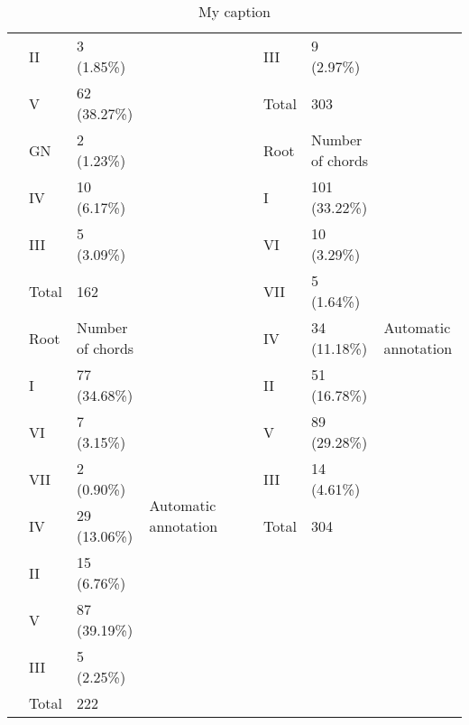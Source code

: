 \begin{table}[]
{\begin{tabular}{|l|l|l|l|lllll}
 & II & 3 (1.85\%) &  & \multicolumn{1}{l|}{} & \multicolumn{1}{l|}{} & \multicolumn{1}{l|}{III} & \multicolumn{1}{l|}{9 (2.97\%)} & \multicolumn{1}{l|}{} \\ \cline{2-3} \cline{7-8}
 & V & 62 (38.27\%) &  & \multicolumn{1}{l|}{} & \multicolumn{1}{l|}{} & \multicolumn{1}{l|}{Total} & \multicolumn{1}{l|}{303} & \multicolumn{1}{l|}{} \\ \cline{2-3} \cline{7-9}
 & GN & 2 (1.23\%) &  & \multicolumn{1}{l|}{} & \multicolumn{1}{l|}{} & \multicolumn{1}{l|}{Root} & \multicolumn{1}{l|}{Number of chords} & \multicolumn{1}{l|}{\multirow{9}{*}{Automatic annotation}} \\ \cline{2-3} \cline{7-8}
 & IV & 10 (6.17\%) &  & \multicolumn{1}{l|}{} & \multicolumn{1}{l|}{} & \multicolumn{1}{l|}{I} & \multicolumn{1}{l|}{101 (33.22\%)} & \multicolumn{1}{l|}{} \\ \cline{2-3} \cline{7-8}
 & III & 5 (3.09\%) &  & \multicolumn{1}{l|}{} & \multicolumn{1}{l|}{} & \multicolumn{1}{l|}{VI} & \multicolumn{1}{l|}{10 (3.29\%)} & \multicolumn{1}{l|}{} \\ \cline{2-3} \cline{7-8}
 & Total & 162 &  & \multicolumn{1}{l|}{} & \multicolumn{1}{l|}{} & \multicolumn{1}{l|}{VII} & \multicolumn{1}{l|}{5 (1.64\%)} & \multicolumn{1}{l|}{} \\ \cline{2-4} \cline{7-8}
 & Root & Number of chords & \multirow{9}{*}{Automatic annotation} & \multicolumn{1}{l|}{} & \multicolumn{1}{l|}{} & \multicolumn{1}{l|}{IV} & \multicolumn{1}{l|}{34 (11.18\%)} & \multicolumn{1}{l|}{} \\ \cline{2-3} \cline{7-8}
 & I & 77 (34.68\%) &  & \multicolumn{1}{l|}{} & \multicolumn{1}{l|}{} & \multicolumn{1}{l|}{II} & \multicolumn{1}{l|}{51 (16.78\%)} & \multicolumn{1}{l|}{} \\ \cline{2-3} \cline{7-8}
 & VI & 7 (3.15\%) &  & \multicolumn{1}{l|}{} & \multicolumn{1}{l|}{} & \multicolumn{1}{l|}{V} & \multicolumn{1}{l|}{89 (29.28\%)} & \multicolumn{1}{l|}{} \\ \cline{2-3} \cline{7-8}
 & VII & 2 (0.90\%) &  & \multicolumn{1}{l|}{} & \multicolumn{1}{l|}{} & \multicolumn{1}{l|}{III} & \multicolumn{1}{l|}{14 (4.61\%)} & \multicolumn{1}{l|}{} \\ \cline{2-3} \cline{7-8}
 & IV & 29 (13.06\%) &  & \multicolumn{1}{l|}{} & \multicolumn{1}{l|}{} & \multicolumn{1}{l|}{Total} & \multicolumn{1}{l|}{304} & \multicolumn{1}{l|}{} \\ \cline{2-3} \cline{6-9}
 & II & 15 (6.76\%) &  &  &  &  &  &  \\ \cline{2-3}
 & V & 87 (39.19\%) &  &  &  &  &  &  \\ \cline{2-3}
 & III & 5 (2.25\%) &  &  &  &  &  &  \\ \cline{2-3}
 & Total & 222 &  &  &  &  &  &  \\ \cline{1-4}
\end{tabular}
}
\caption{My caption}
\label{my-label}
\end{table}


\newpage

